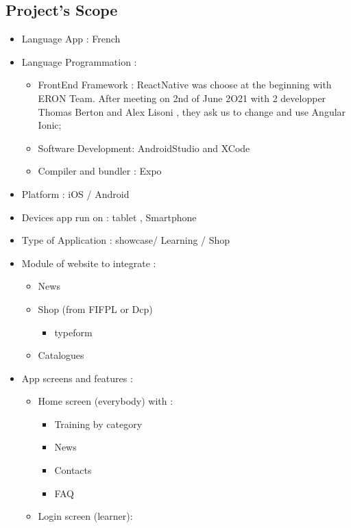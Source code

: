 \documentclass[
  12pt,
]{article}
\providecommand{\tightlist}{%
  \setlength{\itemsep}{0pt}\setlength{\parskip}{0pt}}
\begin{document}
\hypertarget{projects-scope}{%
\subsection{Project's Scope}\label{projects-scope}}

\begin{itemize}
\tightlist
\item
  Language App : French
\item
  Language Programmation :

  \begin{itemize}
  \tightlist
  \item
    FrontEnd Framework : ReactNative was choose at the beginning with
    ERON Team. After meeting on 2nd of June 2O21 with 2 developper
    Thomas Berton and Alex Lisoni , they ask us to change and use
    Angular Ionic;
  \item
    Software Development: AndroidStudio and XCode
  \item
    Compiler and bundler : Expo
  \end{itemize}
\item
  Platform : iOS / Android
\item
  Devices app run on : tablet , Smartphone
\item
  Type of Application : showcase/ Learning / Shop
\item
  Module of website to integrate :

  \begin{itemize}
  \tightlist
  \item
    News
  \item
    Shop (from FIFPL or Dcp)

    \begin{itemize}
    \tightlist
    \item
      typeform
    \end{itemize}
  \item
    Catalogues
  \end{itemize}
\item
  App screens and features :

  \begin{itemize}
  \tightlist
  \item
    Home screen (everybody) with :

    \begin{itemize}
    \tightlist
    \item
      Training by category
    \item
      News
    \item
      Contacts
    \item
      FAQ
    \end{itemize}
  \item
    Login screen (learner):


\end{itemize}
\end{itemize}
\end{document}
